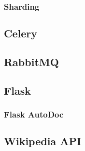 \subsubsection{Sharding}


\subsection{Celery}

\subsection{RabbitMQ}

\subsection{Flask}

\subsubsection{Flask AutoDoc}

\subsection{Wikipedia API}

